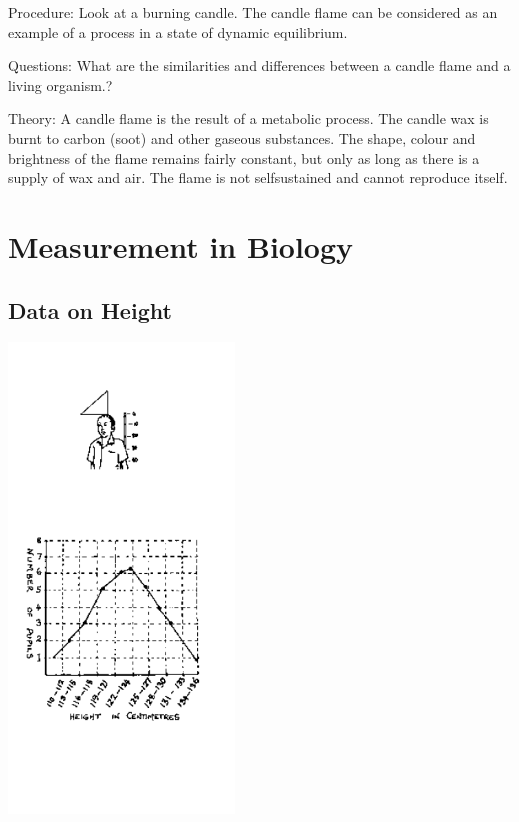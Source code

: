 \begin{multicols}{2}
\begin{description*}
\item[Procedure:]{Look at a burning candle. The candle flame can be considered as an example of a process
in a state of dynamic equilibrium.}
\item[Questions:]{What are the similarities and differences between a candle flame and a living organism.?}
\item[Theory:]{A candle flame is the result of a metabolic process. The candle wax is burnt to carbon
(soot) and other gaseous substances. The shape, colour and brightness of the flame remains
fairly constant, but only as long as there is a supply of wax and air. The flame is not selfsustained
and cannot reproduce itself.}
\end{description*}


\section*{Measurement in Biology} 


\subsection{Data on Height} %

\begin{center}
\includegraphics[width=0.45\textwidth]{./img/source/data-height.png}
\end{center}


\end{multicols}
